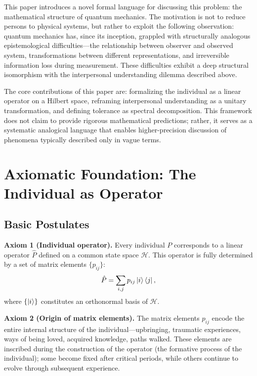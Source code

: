 ﻿\documentclass[11pt,a4paper]{article}
\begin{document}
This paper introduces a novel formal language for discussing this problem: the mathematical structure of quantum mechanics. The motivation is not to reduce persons to physical systems, but rather to exploit the following observation: quantum mechanics has, since its inception, grappled with structurally analogous epistemological difficulties---the relationship between observer and observed system, transformations between different representations, and irreversible information loss during measurement. These difficulties exhibit a deep structural isomorphism with the interpersonal understanding dilemma described above.

The core contributions of this paper are: formalizing the individual as a linear operator on a Hilbert space, reframing interpersonal understanding as a unitary transformation, and defining tolerance as spectral decomposition. This framework does not claim to provide rigorous mathematical predictions; rather, it serves as a systematic analogical language that enables higher-precision discussion of phenomena typically described only in vague terms.

\section{Axiomatic Foundation: The Individual as Operator}

\subsection{Basic Postulates}

\textbf{Axiom 1 (Individual operator).} Every individual $P$ corresponds to a linear operator $\hat{P}$ defined on a common state space $\mathcal{H}$. This operator is fully determined by a set of matrix elements $\{p_{ij}\}$:
\begin{equation}
\hat{P} = \sum_{i,j} p_{ij} \ket{i}\bra{j},
\label{eq:operator}
\end{equation}
where $\{\ket{i}\}$ constitutes an orthonormal basis of $\mathcal{H}$.

\textbf{Axiom 2 (Origin of matrix elements).} The matrix elements $p_{ij}$ encode the entire internal structure of the individual---upbringing, traumatic experiences, ways of being loved, acquired knowledge, paths walked. These elements are inscribed during the construction of the operator (the formative process of the individual); some become fixed after critical periods, while others continue to evolve through subsequent experience.
\end{document}

